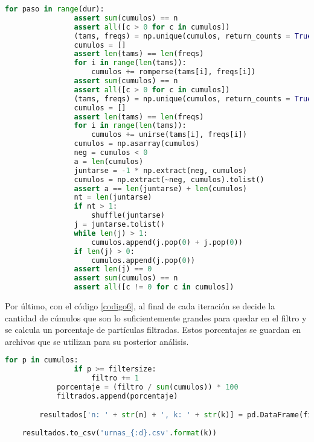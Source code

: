 \documentclass{article}
\begin{document}
\begin{lstlisting}[caption=Fractura y Uni\'on de C\'umulos en la Iteraci\'on, label=codigo5, language=Python]
            for paso in range(dur):
                assert sum(cumulos) == n
                assert all([c > 0 for c in cumulos]) 
                (tams, freqs) = np.unique(cumulos, return_counts = True)
                cumulos = []
                assert len(tams) == len(freqs)
                for i in range(len(tams)):
                    cumulos += romperse(tams[i], freqs[i]) 
                assert sum(cumulos) == n
                assert all([c > 0 for c in cumulos]) 
                (tams, freqs) = np.unique(cumulos, return_counts = True)
                cumulos = []
                assert len(tams) == len(freqs)
                for i in range(len(tams)):
                    cumulos += unirse(tams[i], freqs[i])
                cumulos = np.asarray(cumulos)
                neg = cumulos < 0
                a = len(cumulos)
                juntarse = -1 * np.extract(neg, cumulos)
                cumulos = np.extract(~neg, cumulos).tolist()
                assert a == len(juntarse) + len(cumulos)
                nt = len(juntarse)
                if nt > 1:
                    shuffle(juntarse)
                j = juntarse.tolist()
                while len(j) > 1:
                    cumulos.append(j.pop(0) + j.pop(0))
                if len(j) > 0:
                    cumulos.append(j.pop(0))
                assert len(j) == 0
                assert sum(cumulos) == n
                assert all([c != 0 for c in cumulos])
\end{lstlisting}

Por \'ultimo, con el c\'odigo \ref{codigo6}, al final de cada iteraci\'on se decide la cantidad de c\'umulos que son lo suficientemente grandes para quedar en el filtro y se calcula un porcentaje de part\'iculas filtradas. Estos porcentajes se guardan en archivos que se utilizan para su posterior an\'alisis.

\begin{lstlisting}[caption=C\'alculo de Porcentajes de Part\'iculas Filtradas, label=codigo6, language=Python]
            for p in cumulos:
                if p >= filtersize:
                    filtro += 1
            porcentaje = (filtro / sum(cumulos)) * 100
            filtrados.append(porcentaje)

        resultados['n: ' + str(n) + ', k: ' + str(k)] = pd.DataFrame(filtrados)
    
    resultados.to_csv('urnas_{:d}.csv'.format(k))            
\end{lstlisting}
\end{document}
